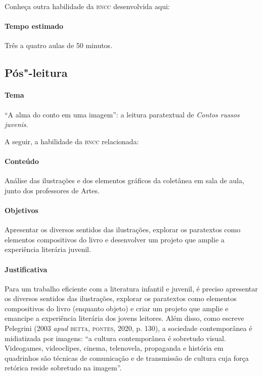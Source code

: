 \documentclass[11pt]{extarticle}
\begin{document}
Conheça outra habilidade da \textsc{bncc} desenvolvida aqui:

\paragraph{Tempo estimado} Três a quatro aulas de 50 minutos.

\subsection{Pós"-leitura}

\paragraph{Tema} ``A alma do conto em uma imagem'': a leitura paratextual de \emph{Contos russos juvenis}.

A seguir, a habilidade da \textsc{bncc} relacionada:

\paragraph{Conteúdo}
Análise das ilustrações e dos elementos gráficos da coletânea em sala de aula, junto dos professores de Artes.

\paragraph{Objetivos}
Apresentar os diversos sentidos das ilustrações, explorar os paratextos
como elementos compositivos do livro e desenvolver um projeto que amplie
a experiência literária juvenil.

\paragraph{Justificativa}
Para um trabalho eficiente com a literatura infantil e juvenil, é
preciso apresentar os diversos sentidos das ilustrações, explorar os
paratextos como elementos compositivos do livro (enquanto objeto) e criar um
projeto que amplie e emancipe a experiência literária dos jovens
leitores. Além disso, como escreve
Pelegrini (2003 \emph{apud} \textsc{betta}, \textsc{pontes}, 2020, p. 130), a sociedade
contemporânea é midiatizada por imagens: ``a cultura contemporânea é
sobretudo visual. Videogames, videoclipes, cinema, telenovela,
propaganda e história em quadrinhos são técnicas de comunicação e de
transmissão de cultura cuja força retórica reside sobretudo na imagem''.
\end{document}
